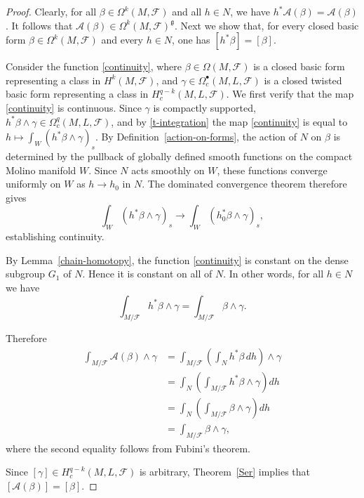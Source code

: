\documentclass[reqno, 11pt]{amsart}
\theoremstyle{definition}
\theoremstyle{property}
\theoremstyle{remark}
\numberwithin{equation}{section}
\begin{document}
\begin{proof}
Clearly, for all $\beta \in \Omega^k(M, \mathcal{F})$ and all $h\in N$, we have
$h^*\mathcal{A}(\beta)=\mathcal{A}(\beta)$. It follows that
$\mathcal{A}(\beta) \in \Omega^k(M, \mathcal{F})^{\mathfrak{g}}$. Next we show that,
for every closed basic form $\beta\in \Omega^{k}(M, \mathcal{F})$ and every $h\in N$,
one has $[h^*\beta]=[\beta]$.

Consider the function \eqref{continuity}, where $\beta\in \Omega(M, \mathcal{F})$
is a closed basic form representing a class in $H^k(M,\mathcal F)$, and
$\gamma \in \Omega_c^\bullet(M, L, \mathcal{F})$ is a closed twisted basic form
representing a class in $H^{q-k}_c(M, L, \mathcal{F})$. We first verify that the map
\eqref{continuity} is continuous. Since $\gamma$ is compactly supported,
$h^*\beta \wedge \gamma \in \Omega_c^q(M, L, \mathcal{F})$, and by \eqref{t-integration}
the map \eqref{continuity} is equal to
$h \mapsto \int_W (h^*\beta \wedge \gamma)_s$.
By Definition~\ref{action-on-forms}, the action of $N$ on $\beta$ is determined by the pullback of
globally defined smooth functions on the compact Molino manifold $W$. Since $N$
acts smoothly on $W$, these functions converge uniformly on $W$ as $h \to h_0$ in $N$.
The dominated convergence theorem therefore gives
\[
\int_W (h^*\beta \wedge \gamma)_s \longrightarrow \int_W (h_0^*\beta \wedge \gamma)_s,
\]
establishing continuity.

By Lemma~\ref{chain-homotopy}, the function \eqref{continuity} is constant
on the dense subgroup $G_1$ of $N$. Hence it is constant on all of $N$. In other
words, for all $h\in N$ we have
\[
\int_{M/\mathcal{F}} h^*\beta \wedge \gamma
=
\int_{M/\mathcal{F}} \beta\wedge \gamma.
\]

Therefore
\[
\begin{split}
\int_{M/\mathcal{F}} \mathcal{A}(\beta)\wedge \gamma
&=\int_{M/\mathcal{F}} \left(\int_N h^*\beta\, dh\right) \wedge \gamma \\
&=\int_N \left(\int_{M/\mathcal{F}} h^*\beta \wedge \gamma\right) dh \\
&=\int_N \left(\int_{M/\mathcal{F}} \beta \wedge \gamma\right) dh \\
&=\int_{M/\mathcal{F}} \beta \wedge \gamma,
\end{split}
\]
where the second equality follows from Fubini's theorem.

Since $[\gamma]\in H_c^{q-k}(M, L, \mathcal{F})$ is arbitrary, Theorem~\ref{Ser}
implies that $[\mathcal{A}(\beta)]=[\beta]$.
\end{proof}
\end{document}
